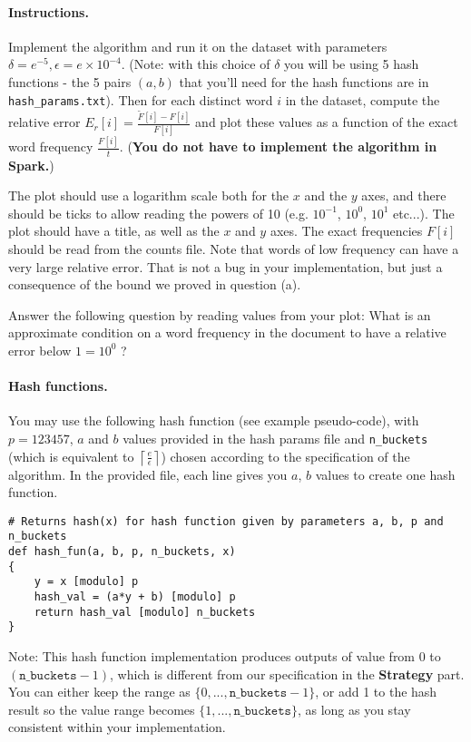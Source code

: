\paragraph{Instructions.}
Implement the algorithm and run it on the dataset with parameters $\delta = e^{-5}, \epsilon = e\times 10^{-4}$. (Note: with this choice of $\delta$ you will be using 5 hash functions - the 5 pairs $(a,b)$ that you'll need for the hash functions are in \texttt{hash\_params.txt}). Then for each distinct word $i$ in the dataset, compute the relative error $E_r[i] = \frac{\tilde{F}[i] - F[i]}{F[i]}$ and plot these values as a function of the exact word frequency $\frac{F[i]}{t}$. (\textbf{You do not have to implement the algorithm in Spark.}) 

The plot should use a logarithm scale both for the $x$ and the $y$ axes, and there should be ticks to allow reading the powers of 10 (e.g. $10^{-1}$, $10^0$, $10^1$ etc...). The plot should have a title, as well as the $x$ and $y$ axes. The exact frequencies $F[i]$  should be read from the counts file. Note that words of low frequency can have a very large relative error. That is not a bug in your implementation, but just a consequence of the bound we proved in question (a).

Answer the following question by reading values from your plot: What is an approximate condition on a word frequency in the document to have a relative error below $1 = 10^0$ ? 

\paragraph{Hash functions.}
You may use the following hash function (see example pseudo-code), with $p = 123457$, $a$ and $b$ values provided in the hash params file and \texttt{n\_buckets} (which is equivalent to $\left\lceil \frac{e}{\epsilon} \right\rceil$) chosen according to the specification of the algorithm. In the provided file, each line gives you $a$, $b$ values to create one hash function.

\begin{verbatim}
# Returns hash(x) for hash function given by parameters a, b, p and n_buckets
def hash_fun(a, b, p, n_buckets, x) 
{
	y = x [modulo] p
	hash_val = (a*y + b) [modulo] p
	return hash_val [modulo] n_buckets
}
\end{verbatim}
Note: This hash function implementation produces outputs of value from $0$ to $(\texttt{n\_buckets}-1)$, which is different from our specification in the \textbf{Strategy} part. You can either keep the range as $\{0, ..., \texttt{n\_buckets}-1\}$, or add 1 to the hash result so the value range becomes $\{1, ..., \texttt{n\_buckets}\}$, as long as you stay consistent within your implementation. 

